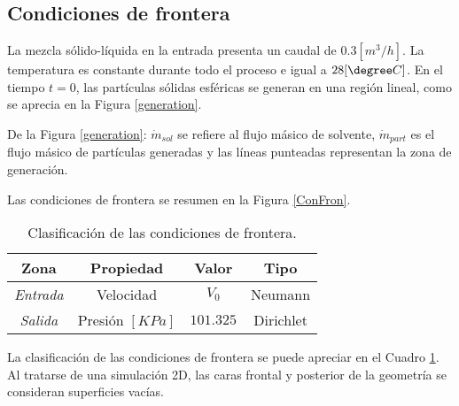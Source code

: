 \subsection{Condiciones de frontera} \label{CondF}

\noindent
\justify

La mezcla s\'olido-l\'iquida en la entrada presenta un caudal de $0.3 \left[m^3 /h \right]$. La temperatura es constante durante todo el proceso e igual a $28 [\degree C]$. En el tiempo $t=0$, las part\'iculas s\'olidas esf\'ericas se generan en una regi\'on lineal, como se aprecia en la Figura \ref{generation}.



\noindent
\justify

De la Figura \ref{generation}: $\dot{m} _{sol}$ se refiere al flujo m\'asico de solvente, $\dot{m} _{part}$ es el flujo m\'asico de part\'iculas generadas y las l\'ineas punteadas representan la zona de generaci\'on.

\noindent
\justify

Las condiciones de frontera se resumen en la Figura \ref{ConFron}.



\begin{table}[h!]
	\centering
	\begin{tabular}{|c|c|c|c|}
		\hline
		\textbf{Zona} & \textbf{Propiedad} & \textbf{Valor} & \textbf{Tipo} \\ \hline
		\textit{Entrada} & Velocidad & $V_0$ & Neumann \\ \hline
		\textit{Salida} & Presi\'on $[KPa]$ & $101.325$ & Dirichlet \\ \hline
	\end{tabular}
	\caption{Clasificaci\'on de las condiciones de frontera.}
	\label{CFT}
\end{table}

\noindent
\justify

La clasificaci\'on de las condiciones de frontera se puede apreciar en el Cuadro \ref{CFT}. Al tratarse de una simulaci\'on 2D, las caras frontal y posterior de la geometr\'ia se consideran superficies vac\'ias.